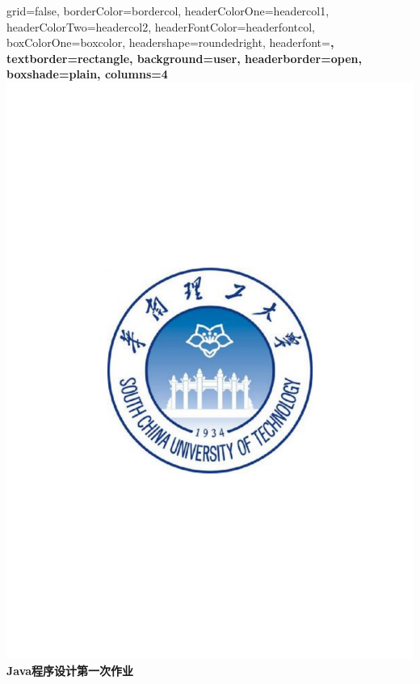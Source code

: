 \documentclass[a0paper,portrait]{baposter}
\begin{document}
\background{ %
}

\begin{poster}{
		grid=false,
		borderColor=bordercol, %
		headerColorOne=headercol1, %
		headerColorTwo=headercol2, %
		headerFontColor=headerfontcol, %
		boxColorOne=boxcolor, %
		headershape=roundedright, %
		headerfont=\Large\sf\bf, %
		textborder=rectangle,
		background=user,
		headerborder=open, %
		boxshade=plain,
		columns=4
	}
	{
		\includegraphics[scale=0.3]{figure/scut.pdf}
	}
	{ \bf  \huge \centering Java程序设计第一次作业} %
	{\vspace{0.5em}}


\end{poster}
\end{document}
